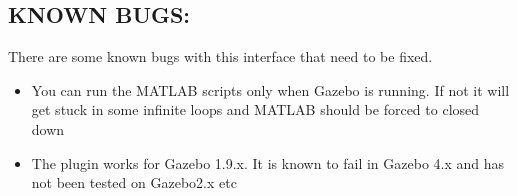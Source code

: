 \documentclass[letterpaper,10pt]{article}
\begin{document}
\subsection{KNOWN BUGS:}\label{known-bugs}

There are some known bugs with this interface that need to be fixed. 
\begin{itemize}
 \item You can run the MATLAB scripts only when Gazebo is running. If not it
will get stuck in some infinite loops and MATLAB should be forced to
closed down 
  \item The plugin works for Gazebo 1.9.x. It is known to fail in Gazebo 4.x and has not been tested on Gazebo2.x etc
\end{itemize}
\end{document}
